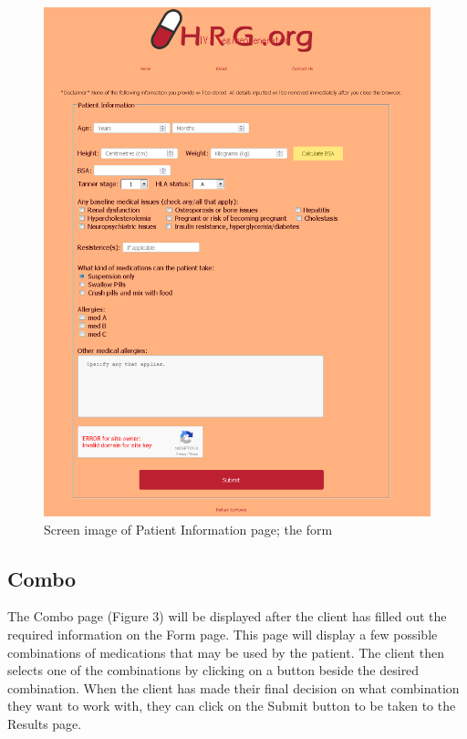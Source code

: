 \documentclass[12pt]{article}
\begin{document}
\begin{figure}[H]
  \centering
  \includegraphics[width=\linewidth]{form1.png}
  \caption{Screen image of Patient Information page; the form}
  \label{fig:form1}
\end{figure}

\subsection{Combo}
The Combo page (Figure 3) will be displayed after the client has filled out the required information on the Form page. This page will display a few possible combinations of medications that may be used by the patient. The client then selects one of the combinations by clicking on a button beside the desired combination. When the client has made their final decision on what combination they want to work with, they can click on the Submit button to be taken to the Results page.
\end{document}
